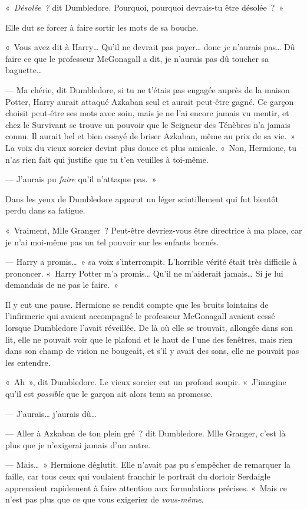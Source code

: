 «~\emph{Désolée~?} dit Dumbledore.
Pourquoi, pourquoi devrais-tu être désolée~?~»

Elle dut se forcer à faire sortir les mots de sa bouche.

«~Vous avez dit à Harry…
Qu'il ne devrait pas payer… donc \emph{je} n'aurais pas…
Dû faire ce que le professeur McGonagall a dit, je n'aurais pas dû toucher sa baguette…

--- Ma chérie, dit Dumbledore, si tu ne t'étais pas engagée auprès de la maison Potter, Harry aurait attaqué Azkaban seul et aurait peut-être gagné.
Ce garçon choisit peut-être ses mots avec soin, mais je ne l'ai encore jamais vu mentir, et chez le Survivant se trouve un pouvoir que le Seigneur des Ténèbres n'a jamais connu.
Il aurait bel et bien essayé de briser Azkaban, même au prix de sa vie.~»
La voix du vieux sorcier devint plus douce et plus amicale.
«~Non, Hermione, tu n'as rien fait qui justifie que tu t'en veuilles à toi-même.

--- J'aurais pu \emph{faire} qu'il n'attaque pas.~»

Dans les yeux de Dumbledore apparut un léger scintillement qui fut bientôt perdu dans sa fatigue.

«~Vraiment, Mlle Granger~?
Peut-être devriez-vous être directrice à ma place, car je n'ai moi-même pas un tel pouvoir sur les enfants bornés.

--- Harry a promis…~»
sa voix s'interrompit.
L'horrible vérité était très difficile à prononcer.
«~Harry Potter m'a promis…
Qu'il ne m'aiderait jamais…
Si je lui demandais de ne pas le faire.~»

Il y eut une pause.
Hermione se rendit compte que les bruits lointains de l'infirmerie qui avaient accompagné le professeur McGonagall avaient cessé lorsque Dumbledore l'avait réveillée.
De là où elle se trouvait, allongée dans son lit, elle ne pouvait voir que le plafond et le haut de l'une des fenêtres, mais rien dans son champ de vision ne bougeait, et s'il y avait des sons, elle ne pouvait pas les entendre.

«~Ah~», dit Dumbledore.
Le vieux sorcier eut un profond soupir.
«~J'imagine qu'il est \emph{possible} que le garçon ait alors tenu sa promesse.

--- J'aurais… j'aurais dû…

--- Aller à Azkaban de ton plein gré~? dit Dumbledore.
Mlle Granger, c'est là plus que je n'exigerai jamais d'un autre.

--- Mais…~»
Hermione déglutit.
Elle n'avait pas pu s'empêcher de remarquer la faille, car tous ceux qui voulaient franchir le portrait du dortoir Serdaigle apprenaient rapidement à faire attention aux formulations précises.
«~Mais ce n'est pas plus que ce que vous exigeriez de \emph{vous-même}.

